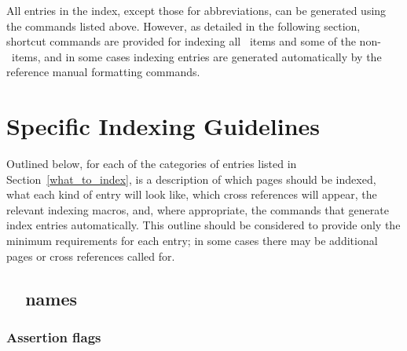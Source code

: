 \documentclass{article}
\begin{document}
All entries in the index, except those for abbreviations, can be 
generated using the commands listed above.
However, as detailed in the following section, shortcut commands are 
provided for indexing all \CC\ items and some of the non-\CC\ items, and 
in some cases indexing entries are generated automatically by
the reference manual formatting commands.

\section{Specific Indexing Guidelines}
\label{how_to_index}

Outlined below, for each of the categories of entries listed in 
Section~\ref{what_to_index}, is a description of which pages should be 
indexed, what each kind of entry will look like, which cross references will 
appear, the relevant indexing macros, and, where appropriate, the commands
that generate index entries automatically.  This outline should be considered 
to provide only the minimum requirements for each entry;  in some cases there 
may be additional pages or cross references called for.  

\subsection{\cgal\ \CC\ names}
\label{cgal_names}

\subsubsection{Assertion flags}%
\label{assertion_flags}
\end{document}
